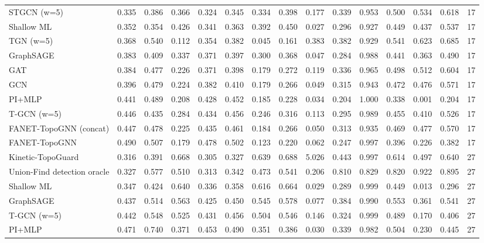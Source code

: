 \begin{tabular}{lrrrrrrrrrrrrrr}
STGCN (w=5) & 0.335 & 0.386 & 0.366 & 0.324 & 0.345 & 0.334 & 0.398 & 0.177 & 0.339 & 0.953 & 0.500 & 0.534 & 0.618 & 17 \\
Shallow ML & 0.352 & 0.354 & 0.426 & 0.341 & 0.363 & 0.392 & 0.450 & 0.027 & 0.296 & 0.927 & 0.449 & 0.437 & 0.537 & 17 \\
TGN (w=5) & 0.368 & 0.540 & 0.112 & 0.354 & 0.382 & 0.045 & 0.161 & 0.383 & 0.382 & 0.929 & 0.541 & 0.623 & 0.685 & 17 \\
GraphSAGE & 0.383 & 0.409 & 0.337 & 0.371 & 0.397 & 0.300 & 0.368 & 0.047 & 0.284 & 0.988 & 0.441 & 0.363 & 0.490 & 17 \\
GAT & 0.384 & 0.477 & 0.226 & 0.371 & 0.398 & 0.179 & 0.272 & 0.119 & 0.336 & 0.965 & 0.498 & 0.512 & 0.604 & 17 \\
GCN & 0.396 & 0.479 & 0.224 & 0.382 & 0.410 & 0.179 & 0.266 & 0.049 & 0.315 & 0.943 & 0.472 & 0.476 & 0.571 & 17 \\
PI+MLP & 0.441 & 0.489 & 0.208 & 0.428 & 0.452 & 0.185 & 0.228 & 0.034 & 0.204 & 1.000 & 0.338 & 0.001 & 0.204 & 17 \\
T-GCN (w=5) & 0.446 & 0.435 & 0.284 & 0.434 & 0.456 & 0.246 & 0.316 & 0.113 & 0.295 & 0.989 & 0.455 & 0.410 & 0.526 & 17 \\
FANET-TopoGNN (concat) & 0.447 & 0.478 & 0.225 & 0.435 & 0.461 & 0.184 & 0.266 & 0.050 & 0.313 & 0.935 & 0.469 & 0.477 & 0.570 & 17 \\
FANET-TopoGNN & 0.490 & 0.507 & 0.179 & 0.478 & 0.502 & 0.123 & 0.220 & 0.062 & 0.247 & 0.997 & 0.396 & 0.226 & 0.382 & 17 \\
Kinetic-TopoGuard & 0.316 & 0.391 & 0.668 & 0.305 & 0.327 & 0.639 & 0.688 & 5.026 & 0.443 & 0.997 & 0.614 & 0.497 & 0.640 & 27 \\
Union-Find detection oracle & 0.327 & 0.577 & 0.510 & 0.313 & 0.342 & 0.473 & 0.541 & 0.206 & 0.810 & 0.829 & 0.820 & 0.922 & 0.895 & 27 \\
Shallow ML & 0.347 & 0.424 & 0.640 & 0.336 & 0.358 & 0.616 & 0.664 & 0.029 & 0.289 & 0.999 & 0.449 & 0.013 & 0.296 & 27 \\
GraphSAGE & 0.437 & 0.514 & 0.563 & 0.425 & 0.450 & 0.545 & 0.578 & 0.077 & 0.384 & 0.990 & 0.553 & 0.361 & 0.541 & 27 \\
T-GCN (w=5) & 0.442 & 0.548 & 0.525 & 0.431 & 0.456 & 0.504 & 0.546 & 0.146 & 0.324 & 0.999 & 0.489 & 0.170 & 0.406 & 27 \\
PI+MLP & 0.471 & 0.740 & 0.371 & 0.453 & 0.490 & 0.351 & 0.386 & 0.030 & 0.339 & 0.982 & 0.504 & 0.230 & 0.445 & 27 \\

\end{tabular}
